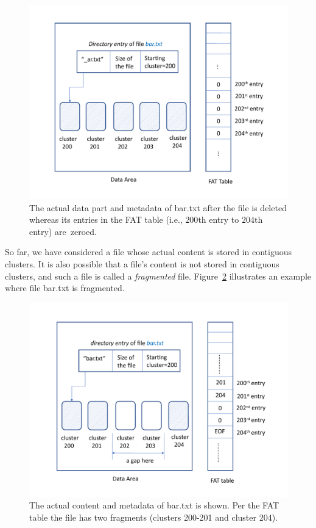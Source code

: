   
\begin{figure}[h]
    \centering
    \includegraphics[width=\linewidth]{fig/fat2.pdf}
    \caption{The actual data part and metadata of bar.txt after the file is deleted whereas its entries in the FAT table (i.e., $200$th entry to $204$th entry) are~zeroed.}
    \label{fig:fat2}
\end{figure}

So far, we have considered a file whose actual content is stored in contiguous clusters. 
It is also possible that a file's content is not stored in contiguous clusters, and such a file is 
called a \emph{fragmented} file. Figure~\ref{fig:fat3} illustrates an example where file bar.txt is fragmented.

 \begin{figure}[h]
     \centering
     \includegraphics[width=\linewidth]{fig/fat3.pdf}
     \caption{The actual content and metadata of bar.txt is shown. Per the FAT table the file has two fragments (clusters 200-201 and cluster 204).}
     \label{fig:fat3}
 \end{figure}



